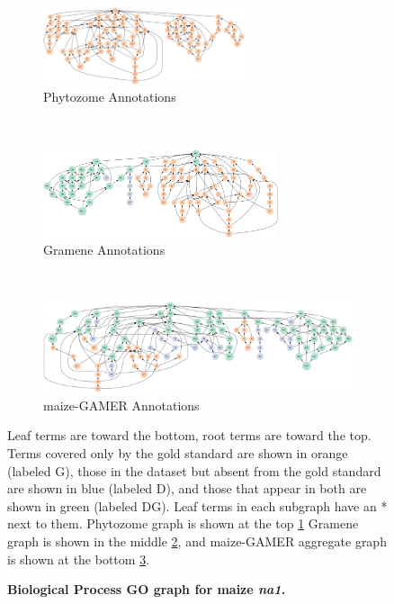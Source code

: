 \begin{figure}[htp]
  \centering
  \begin{subfigure}[t]{\textwidth}
        \centering
        \includegraphics[width=0.65\textwidth]{figures/figure5/phytozome_data.png}
        \caption{Phytozome Annotations}
        \label{fig:phytozome_na1}
  \end{subfigure}%
  \\
  \begin{subfigure}[t]{\textwidth}
        \centering
        \includegraphics[width=0.76\textwidth]{figures/figure5/gramene_data.png}
        \caption{Gramene Annotations}
        \label{fig:gramene_na1}
  \end{subfigure}%
  \\
  \begin{subfigure}[t]{\textwidth}
        \centering
        \includegraphics[width=\textwidth]{figures/figure5/gamer_data.png}
        \caption{maize-GAMER Annotations}
        \label{fig:gamer_na1}
  \end{subfigure}%
  \caption{\textbf{Biological Process GO graph for maize \textit{na1}.}}
  \raggedright
  Leaf terms are toward the bottom, root terms are toward the top.  Terms covered only by the gold standard are shown in orange (labeled G), those in the dataset but absent from the gold standard are shown in blue (labeled D), and those that appear in both are shown in green (labeled DG). Leaf terms in each subgraph have an * next to them. Phytozome graph is shown at the top \ref{fig:phytozome_na1} Gramene graph is shown in the middle \ref{fig:gramene_na1}, and maize-GAMER aggregate graph is shown at the bottom \ref{fig:gamer_na1}.
  \label{fig:na1_diagram}
\end{figure}
